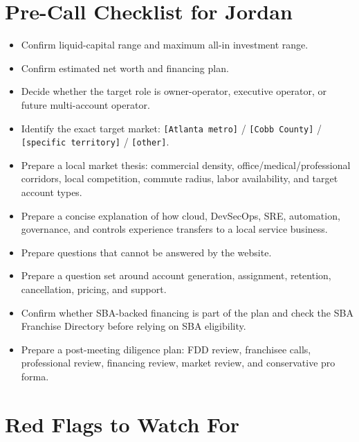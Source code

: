 \documentclass[11pt]{article}
\newcommand{\placeholder}[1]{\textcolor{accent}{\texttt{[#1]}}}
\begin{document}
\section{Pre-Call Checklist for Jordan}

\begin{itemize}
  \item Confirm liquid-capital range and maximum all-in investment range.
  \item Confirm estimated net worth and financing plan.
  \item Decide whether the target role is owner-operator, executive operator, or future multi-account operator.
  \item Identify the exact target market: \placeholder{Atlanta metro} / \placeholder{Cobb County} / \placeholder{specific territory} / \placeholder{other}.
  \item Prepare a local market thesis: commercial density, office/medical/professional corridors, local competition, commute radius, labor availability, and target account types.
  \item Prepare a concise explanation of how cloud, DevSecOps, SRE, automation, governance, and controls experience transfers to a local service business.
  \item Prepare questions that cannot be answered by the website.
  \item Prepare a question set around account generation, assignment, retention, cancellation, pricing, and support.
  \item Confirm whether SBA-backed financing is part of the plan and check the SBA Franchise Directory before relying on SBA eligibility.
  \item Prepare a post-meeting diligence plan: FDD review, franchisee calls, professional review, financing review, market review, and conservative pro forma.
\end{itemize}

\section{Red Flags to Watch For}
\end{document}
